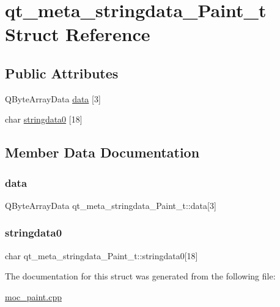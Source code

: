 \hypertarget{structqt__meta__stringdata__Paint__t}{}\section{qt\+\_\+meta\+\_\+stringdata\+\_\+\+Paint\+\_\+t Struct Reference}
\label{structqt__meta__stringdata__Paint__t}
\subsection*{Public Attributes}
\begin{DoxyCompactItemize}
\item 
Q\+Byte\+Array\+Data \mbox{\hyperlink{structqt__meta__stringdata__Paint__t_a8640c3cb3ec18aa8d8d2547258df808e}{data}} \mbox{[}3\mbox{]}
\item 
char \mbox{\hyperlink{structqt__meta__stringdata__Paint__t_a537714452ba244b4f9c2ac5dcbd282c6}{stringdata0}} \mbox{[}18\mbox{]}
\end{DoxyCompactItemize}


\subsection{Member Data Documentation}
\mbox{\label{structqt__meta__stringdata__Paint__t_a8640c3cb3ec18aa8d8d2547258df808e}} 
\subsubsection{\texorpdfstring{data}{data}}
{\footnotesize\ttfamily Q\+Byte\+Array\+Data qt\+\_\+meta\+\_\+stringdata\+\_\+\+Paint\+\_\+t\+::data\mbox{[}3\mbox{]}}

\mbox{\label{structqt__meta__stringdata__Paint__t_a537714452ba244b4f9c2ac5dcbd282c6}} 
\subsubsection{\texorpdfstring{stringdata0}{stringdata0}}
{\footnotesize\ttfamily char qt\+\_\+meta\+\_\+stringdata\+\_\+\+Paint\+\_\+t\+::stringdata0\mbox{[}18\mbox{]}}



The documentation for this struct was generated from the following file\+:\begin{DoxyCompactItemize}
\item 
\mbox{\hyperlink{moc__paint_8cpp}{moc\+\_\+paint.\+cpp}}\end{DoxyCompactItemize}
